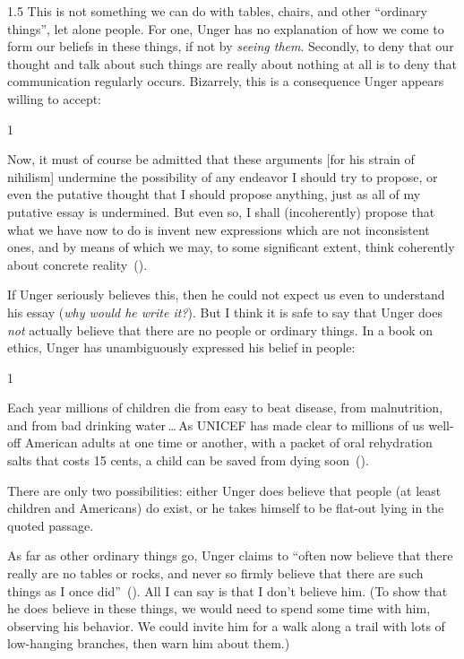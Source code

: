 \documentclass[11pt]{article}
\newenvironment{squote}{%
	\begin{spacing}{1}
	\begin{list}{}{%
	\setlength{\labelwidth}{0pt}%
	\rightmargin\leftmargin%
	}
	\item\relax
	}{%
	\end{list}%
	\end{spacing}
	}
\begin{document}
\begin{spacing}{1.5}
This is not something we can do with tables, chairs, and other
``ordinary things'', let alone people.  For one, Unger has no
explanation of how we come to form our beliefs in these things, if not
by {\em seeing them}.  Secondly, to deny that our thought and talk
about such things are really about nothing at all is to deny that
communication regularly occurs.  Bizarrely, this is a consequence
Unger appears willing to accept:
\begin{squote}
Now, it must of course be admitted that these arguments [for his
  strain of nihilism] undermine the possibility of any endeavor I
should try to propose, or even the putative thought that I should
propose anything, just as all of my putative essay is undermined.  But
even so, I shall (incoherently) propose that what we have now to do is
invent new expressions which are not inconsistent ones, and by means
of which we may, to some significant extent, think coherently about
concrete reality~(\citeyear[544]{unger1980b}).
\end{squote}
If Unger seriously believes this, then he could not expect us even to
understand his essay ({\em why would he write it?}).  But I think it
is safe to say that Unger does {\em not} actually believe that there
are no people or ordinary things.  In a book on ethics, Unger has
unambiguously expressed his belief in people:

\begin{squote}
Each year millions of children die from easy to beat disease, from
malnutrition, and from bad drinking water\,\ldots\,As UNICEF has made
clear to millions of us well-off American adults at one time or
another, with a packet of oral rehydration salts that costs 15 cents,
a child can be saved from dying soon~(\citeyear[3]{unger1996}).
\end{squote}
There are only two possibilities: either Unger does believe that
people (at least children and Americans) do exist, or he takes himself
to be flat-out lying in the quoted passage.

As far as other ordinary things go, Unger claims to ``often now
believe that there really are no tables or rocks, and never so firmly
believe that there are such things as I once
did''~(\citeyear[543]{unger1980b}).  All I can say is that I don't
believe him.  (To show that he does believe in these things, we would
need to spend some time with him, observing his behavior.  We could
invite him for a walk along a trail with lots of low-hanging branches,
then warn him about them.)


\end{spacing}
\end{document}
